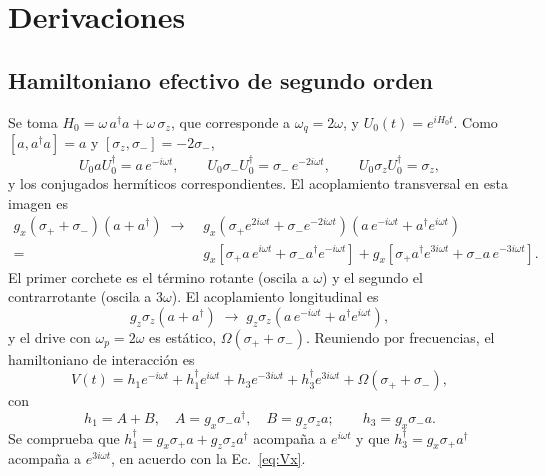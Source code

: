 \documentclass[11pt,a4paper]{article}
\newcommand{\spl}{\sigma_{+}}
\newcommand{\smi}{\sigma_{-}}
\theoremstyle{definition}
\begin{document}
\section{Derivaciones}
\label{sec:deriv}

\subsection{Hamiltoniano efectivo de segundo orden}

\label{sec:interaccion}

Se toma $H_0=\omega\,a^{\dagger}a+\omega\,\sigma_z$, que corresponde a $\omega_q=2\omega$, y $U_0(t)=e^{iH_0t}$. Como $[a,a^{\dagger}a]=a$ y $[\sigma_z,\smi]=-2\smi$,
\begin{equation}
U_0aU_0^{\dagger}=a\,e^{-i\omega t},\qquad U_0\smi U_0^{\dagger}=\smi\,e^{-2i\omega t},\qquad U_0\sigma_zU_0^{\dagger}=\sigma_z,
\label{eq:transf}
\end{equation}
y los conjugados hermíticos correspondientes. El acoplamiento transversal en esta imagen es
\begin{align}
g_x(\spl+\smi)(a+a^{\dagger})\;\to\;&g_x\left(\spl e^{2i\omega t}+\smi e^{-2i\omega t}\right)\left(a\,e^{-i\omega t}+a^{\dagger}e^{i\omega t}\right)\nonumber\\
=\;&g_x\left[\spl a\,e^{i\omega t}+\smi a^{\dagger}e^{-i\omega t}\right]+g_x\left[\spl a^{\dagger}e^{3i\omega t}+\smi a\,e^{-3i\omega t}\right].
\label{eq:Vx}
\end{align}
El primer corchete es el término rotante (oscila a $\omega$) y el segundo el contrarrotante (oscila a $3\omega$). El acoplamiento longitudinal es
\begin{equation}
g_z\sigma_z(a+a^{\dagger})\;\to\;g_z\sigma_z\left(a\,e^{-i\omega t}+a^{\dagger}e^{i\omega t}\right),
\end{equation}
y el drive con $\omega_p=2\omega$ es estático, $\Omega(\spl+\smi)$. Reuniendo por frecuencias, el hamiltoniano de interacción es
\begin{equation}
V(t)=h_1e^{-i\omega t}+h_1^{\dagger}e^{i\omega t}+h_3e^{-3i\omega t}+h_3^{\dagger}e^{3i\omega t}+\Omega(\spl+\smi),
\label{eq:V}
\end{equation}
con
\begin{equation}
h_1=A+B,\quad A=g_x\smi a^{\dagger},\quad B=g_z\sigma_za;\qquad h_3=g_x\smi a.
\label{eq:hs}
\end{equation}
Se comprueba que $h_1^{\dagger}=g_x\spl a+g_z\sigma_za^{\dagger}$ acompaña a $e^{i\omega t}$ y que $h_3^{\dagger}=g_x\spl a^{\dagger}$ acompaña a $e^{3i\omega t}$, en acuerdo con la Ec.~\eqref{eq:Vx}.
\end{document}
